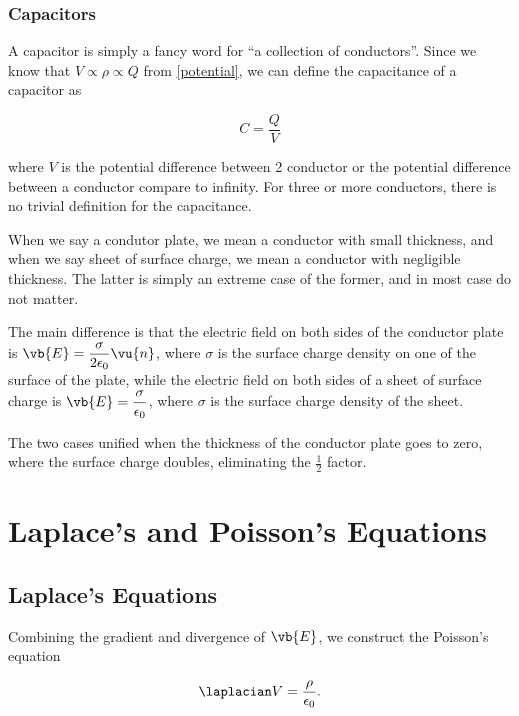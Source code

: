 \documentclass[english,a4paper,12pt]{report}
\begin{document}
\subsection{Capacitors}

A capacitor is simply a fancy word for ``a collection of conductors''. Since we know that \(V \propto \rho \propto Q\) from \cref{potential}, we can define the capacitance of a capacitor as

\begin{equation}
    C = \frac{Q}{V} 	
\end{equation}

where \(V\) is the potential difference between 2 conductor or the potential difference between a conductor compare to infinity. For three or more conductors, there is no trivial definition for the capacitance.

When we say a condutor plate, we mean a conductor with small thickness, and when we say sheet of surface charge, we mean a conductor with negligible thickness. The latter is simply an extreme case of the former, and in most case do not matter. 

The main difference is that the electric field on both sides of the conductor plate is \(\displaystyle\vb{E} = \frac{\sigma }{2\epsilon _0}\vu{n}  \), where \(\sigma \) is the surface charge density on one of the surface of the plate, while the electric field on both sides of a sheet of surface charge is \(\displaystyle\vb{E} = \frac{\sigma}{\epsilon _0} \), where \(\sigma \) is the surface charge density of the sheet.   

The two cases unified when the thickness of the conductor plate goes to zero, where the surface charge doubles, eliminating the \(\frac{1}{2} \) factor.  

\chapter{Laplace's and Poisson's Equations}

\section{Laplace's Equations}


Combining the gradient and divergence of \(\vb{E} \), we construct the Poisson's equation

\begin{equation}
    \laplacian V = \frac{\rho }{\epsilon _0}. 
\end{equation}
\end{document}
